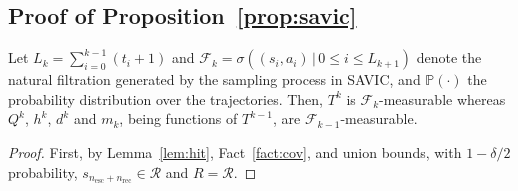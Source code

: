 \documentclass{article}
\theoremstyle{definition}
\theoremstyle{remark}
\newcommand{\cR}{\mathcal{R}}
\newcommand{\prob}{\mathbb{P}}
\begin{document}
\subsection{Proof of Proposition~\ref{prop:savic}}




Let $L_k=\sum^{k-1}_{i=0}(t_i+1)$ and $\mathcal{F}_k=\sigma((s_i,a_i)\,|\, 0\le i\le L_{k+1})$ denote the natural filtration generated by the sampling process in {\rm SAVIC}, and $\prob(\cdot)$ the probability distribution over the trajectories.
Then, $T^k$ is $\mathcal{F}_k$-measurable  whereas $Q^k$, $h^k$, $d^k$ and $m_k$, being functions of $T^{k-1}$, are $\mathcal{F}_{k-1}$-measurable. 

\begin{proof}
First, by Lemma~\ref{lem:hit}, Fact~\ref{fact:cov}, and union bounds, with $1-\delta/2$ probability, $s_{n_{\mathrm{esc}}+n_{\mathrm{rec}}}\in \cR$ and $R=\cR$. 


\end{proof}
\end{document}
